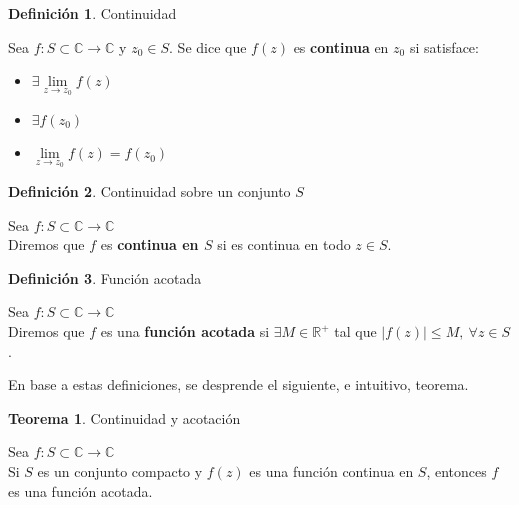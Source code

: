 \documentclass[12pt]{article}
\theoremstyle{definition}
\newtheorem{definition}{Definici\'on}[section]
\theoremstyle{theorem}
\newtheorem{theorem}{Teorema}[section]
\begin{document}
\colorbox{green!40!white!80}{\parbox{\linewidth}{
\theoremstyle{definition}
\begin{definition} {Continuidad}

Sea $f: S \subset \mathbb{C} \rightarrow \mathbb{C}$ y $z_0 \in S$. Se dice que $f(z)$ es \textbf{continua} en $z_0$ si satisface:
\begin{itemize}
	\item $\exists \lim\limits_{z\rightarrow z_0}f(z)$
	\item $\exists f(z_0)$
	\item $\lim\limits_{z\rightarrow z_0}f(z) = f(z_0)$
\end{itemize}

\end{definition}}}
\linebreak
\linebreak

\colorbox{green!40!white!80}{\parbox{\linewidth}{
\theoremstyle{definition}
\begin{definition} {Continuidad sobre un conjunto $S$}

Sea $f: S \subset \mathbb{C} \rightarrow \mathbb{C}$\\
Diremos que $f$ es \textbf{continua en $S$} si es continua en todo $z \in S$.
\end{definition}}}
\linebreak
\linebreak

\colorbox{green!40!white!80}{\parbox{\linewidth}{
\theoremstyle{definition}
\begin{definition} {Funci\'on acotada}

Sea $f: S \subset \mathbb{C} \rightarrow \mathbb{C}$\\
Diremos que $f$ es una \textbf{funci\'on acotada} si $\exists M \in \mathbb{R}^+$ tal que $|f(z)| \leq M,\ \forall z \in S$.
\end{definition}}}
\linebreak
\linebreak

En base a estas definiciones, se desprende el siguiente, e intuitivo, teorema.\\

\colorbox{orange!40!white!80}{\parbox{\linewidth}{
\theoremstyle{theorem}
\begin{theorem} {Continuidad y acotaci\'on}

Sea $f: S \subset \mathbb{C} \rightarrow \mathbb{C}$\\
Si $S$ es un conjunto compacto y $f(z)$ es una funci\'on continua en $S$, entonces $f$ es una funci\'on acotada.
\end{theorem}}}
\linebreak
\linebreak
\end{document}
